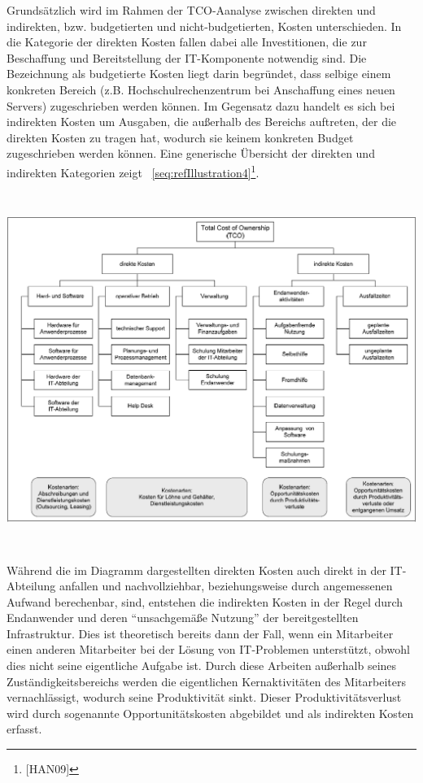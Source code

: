 \documentclass[a4paper]{article}
\makeatletter
\newcommand\captionof[1]{\def\@captype{#1}\caption}
\makeatother
\begin{document}
\bigskip

{\sffamily
Grundsätzlich wird im Rahmen der TCO-Aanalyse zwischen direkten und indirekten, bzw. budgetierten und
nicht-budgetierten, Kosten unterschieden. In die Kategorie der direkten Kosten fallen dabei alle Investitionen, die zur
Beschaffung und Bereitstellung der IT-Komponente notwendig sind. Die Bezeichnung als budgetierte Kosten liegt darin
begründet, dass selbige einem konkreten Bereich (z.B. Hochschulrechenzentrum bei Anschaffung eines neuen Servers)
zugeschrieben werden können. Im Gegensatz dazu handelt es sich bei indirekten Kosten um Ausgaben, die außerhalb des
Bereichs auftreten, der die direkten Kosten zu tragen hat, wodurch sie keinem konkreten Budget zugeschrieben werden
können. Eine generische Übersicht der direkten und indirekten Kategorien zeigt
\figurename~\ref{seq:refIllustration4}\footnote{[HAN09]}.}


\bigskip

{\centering \includegraphics[width=15.45cm,height=11.555cm]{INMAusarbeitung02-img/INMAusarbeitung02-img005.png}
\captionof{figure}[: \ generische Kostenkategorien {}-und Arten (Hanser 09)]{: \ generische Kostenkategorien -und Arten
\textcolor[rgb]{1.0,0.2,0.2}{(Hanser 09)}}
\label{seq:refIllustration4}
\par}
{\sffamily
Während die im Diagramm dargestellten direkten Kosten auch direkt in der IT-Abteilung anfallen und nachvollziehbar,
beziehungsweise durch angemessenen Aufwand berechenbar, sind, entstehen die indirekten Kosten in der Regel durch
Endanwender und deren “unsachgemäße Nutzung” der bereitgestellten Infrastruktur. Dies ist theoretisch bereits dann der
Fall, wenn ein Mitarbeiter einen anderen Mitarbeiter bei der Lösung von IT-Problemen unterstützt, obwohl dies nicht
seine eigentliche Aufgabe ist. Durch diese Arbeiten außerhalb seines Zuständigkeitsbereichs werden die eigentlichen
Kernaktivitäten des Mitarbeiters vernachlässigt, wodurch seine Produktivität sinkt. Dieser Produktivitätsverlust wird
durch sogenannte Opportunitätskosten abgebildet und als indirekten Kosten erfasst.}
\end{document}
